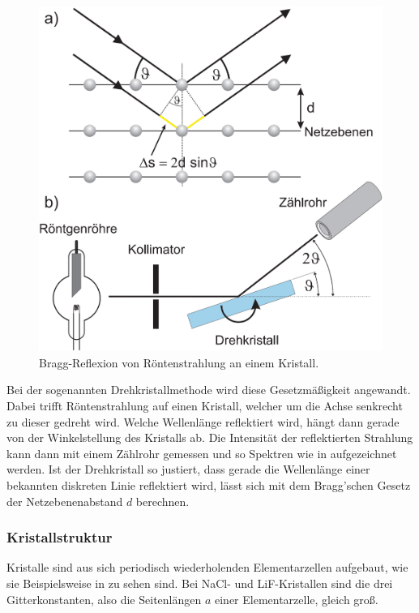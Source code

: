 \begin{figure}[H]
  \centering
  \includegraphics[width=.9\textwidth,trim={2cm 14cm 0.5cm 0},clip]{files/bragg_reflexion_drehkristall.png}
  \caption{Bragg-Reflexion von Röntenstrahlung an einem Kristall.}
  \label{fig:bragg_reflexion_drehkristall_a}
\end{figure}

Bei der sogenannten Drehkristallmethode wird diese Gesetzmäßigkeit angewandt. Dabei trifft Röntenstrahlung auf einen Kristall, welcher um die Achse senkrecht zu dieser gedreht wird. Welche Wellenlänge reflektiert wird, hängt dann gerade von der Winkelstellung des Kristalls ab. Die Intensität der reflektierten Strahlung kann dann mit einem Zählrohr gemessen und so Spektren wie in  aufgezeichnet werden. Ist der Drehkristall so justiert, dass gerade die Wellenlänge einer bekannten diskreten Linie reflektiert wird, lässt sich mit dem Bragg'schen Gesetz der Netzebenenabstand $d$ berechnen.

\subsubsection*{Kristallstruktur}

Kristalle sind aus sich periodisch wiederholenden Elementarzellen aufgebaut, wie sie Beispielsweise in  zu sehen sind. Bei NaCl- und LiF-Kristallen sind die drei Gitterkonstanten, also die Seitenlängen $a$ einer Elementarzelle, gleich groß.

